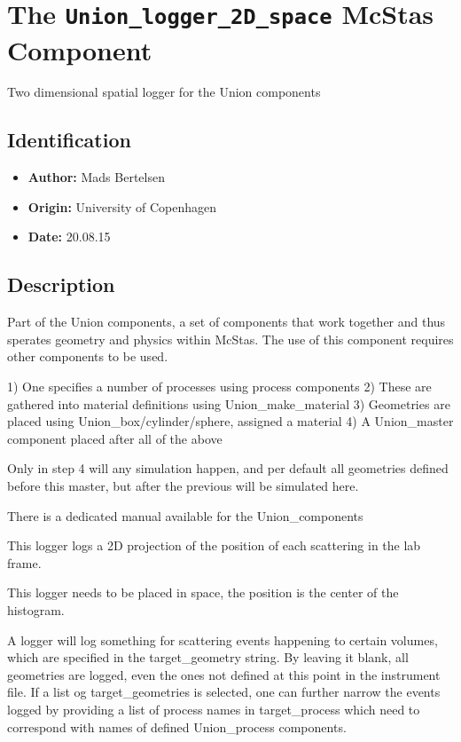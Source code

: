 \section{The \texttt{Union\_logger\_2D\_space} McStas Component}
Two dimensional spatial logger for the Union components

\subsection*{Identification}
\begin{itemize}
  \item \textbf{Author:} Mads Bertelsen
  \item \textbf{Origin:} University of Copenhagen
  \item \textbf{Date:} 20.08.15
\end{itemize}

\subsection*{Description}
Part of the Union components, a set of components that work together and thus sperates geometry and physics within McStas. The use of this component requires other components to be used.

1) One specifies a number of processes using process components 2) These are gathered into material definitions using Union\_make\_material 3) Geometries are placed using Union\_box/cylinder/sphere, assigned a material 4) A Union\_master component placed after all of the above

Only in step 4 will any simulation happen, and per default all geometries defined before this master, but after the previous will be simulated here.

There is a dedicated manual available for the Union\_components

This logger logs a 2D projection of the position of each scattering in the lab frame.

This logger needs to be placed in space, the position is the center of the histogram.

A logger will log something for scattering events happening to certain volumes, which are specified in the target\_geometry string. By leaving it blank, all geometries are logged, even the ones not defined at this point in the instrument file. If a list og target\_geometries is selected, one can further narrow the events logged by providing a list of process names in target\_process which need to correspond with names of defined Union\_process components.

